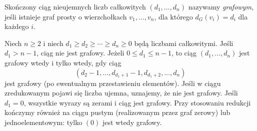 \begin{definicja}
Skończony ciąg nieujemnych liczb całkowitych
$(d_1,\ldots,d_n)$ nazywamy \emph{grafowym},
jeśli istnieje graf prosty o wierzchołkach
$v_1,\ldots,v_n$, dla którego $d_G(v_i)=d_i$
dla każdego $i$.
\end{definicja}

\begin{twierdzenie}
Niech $n\ge2$ i niech
$d_1\ge d_2\ge\cdots\ge d_n\ge0$ będą liczbami
całkowitymi. Jeśli $d_1>n-1$, ciąg nie jest grafowy.
Jeżeli $0\le d_1\le n-1$, to ciąg
$(d_1,\ldots,d_n)$ jest grafowy wtedy i tylko
wtedy, gdy ciąg
\[
(d_2-1,\ldots,d_{d_1+1}-1,
  d_{d_1+2},\ldots,d_n)
\]
jest grafowy (po ewentualnym przestawieniu elementów).
Jeśli w ciągu zredukowanym pojawi się liczba ujemna,
uznajemy, że nie jest grafowy.
Jeśli $d_1=0$, wszystkie wyrazy są zerami i ciąg
jest grafowy. Przy stosowaniu redukcji kończymy również
na ciągu pustym (realizowanym przez graf zerowy) lub
jednoelementowym: tylko $(0)$ jest wtedy grafowy.
\end{twierdzenie}

